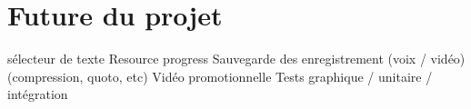 \section{Future du projet}
sélecteur de texte
Resource progress
Sauvegarde des enregistrement (voix / vidéo) (compression, quoto, etc)
Vidéo promotionnelle
Tests graphique / unitaire / intégration
